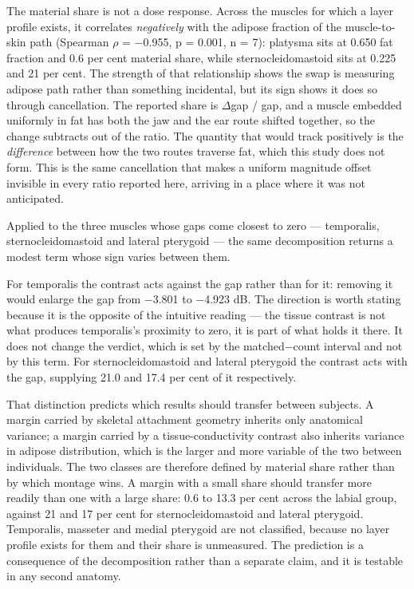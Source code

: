 \documentclass[
  11pt,
]{article}
\begin{document}
The material share is not a dose response. Across the muscles for which a
layer profile exists, it correlates \emph{negatively} with the adipose fraction of
the muscle-to-skin path (Spearman \(\rho\) = −0.955, p = 0.001, n = 7): platysma sits
at 0.650 fat fraction and 0.6 per cent material share, while
sternocleidomastoid sits at 0.225 and 21 per cent. The strength of that
relationship shows the swap is measuring adipose path rather than something
incidental, but its sign shows it does so through cancellation. The reported
share is \textbar{}\(\Delta\)gap\textbar{} / \textbar gap\textbar, and a muscle embedded uniformly in fat has both the
jaw and the ear route shifted together, so the change subtracts out of the
ratio. The quantity that would track positively is the \emph{difference} between
how the two routes traverse fat, which this study does not form. This is the
same cancellation that makes a uniform magnitude offset invisible in every
ratio reported here, arriving in a place where it was not anticipated.

Applied to the three muscles whose gaps come closest to zero --- temporalis,
sternocleidomastoid and lateral pterygoid --- the same decomposition returns a
modest term whose sign varies between them.

For temporalis the contrast acts against the gap rather than for it: removing it
would enlarge the gap from −3.801 to −4.923 dB. The direction is worth stating
because it is the opposite of the intuitive reading --- the tissue contrast is not
what produces temporalis's proximity to zero, it is part of what holds it there.
It does not change the verdict, which is set by the matched−count interval and
not by this term. For sternocleidomastoid and lateral pterygoid the contrast acts
with the gap, supplying 21.0 and 17.4 per cent of it respectively.

That distinction predicts which results should transfer between subjects. A
margin carried by skeletal attachment geometry inherits only anatomical variance;
a margin carried by a tissue-conductivity contrast also inherits variance in
adipose distribution, which is the larger and more variable of the two between
individuals. The two classes are therefore defined by material share rather than
by which montage wins. A margin with a small share should transfer more readily
than one with a large share: 0.6 to 13.3 per cent across the labial group,
against 21 and 17 per cent for sternocleidomastoid and lateral pterygoid.
Temporalis, masseter and medial pterygoid are not classified, because no layer
profile exists for them and their share is unmeasured. The
prediction is a consequence of the decomposition rather than a separate claim,
and it is testable in any second anatomy.
\end{document}
